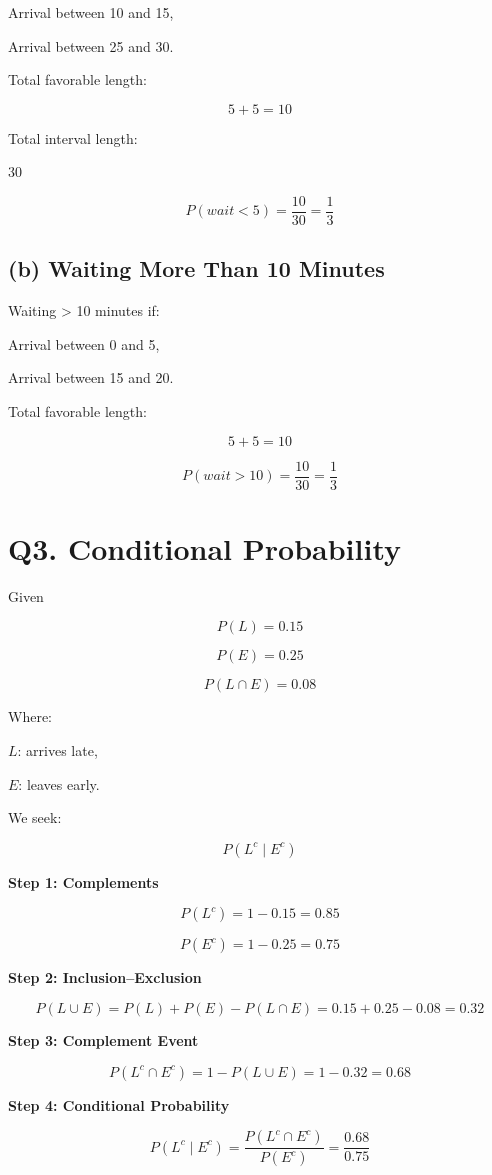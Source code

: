 \documentclass[11pt]{article}
\begin{document}
Arrival between 10 and 15,

Arrival between 25 and 30.

Total favorable length:

\[
5+5=10
\]

Total interval length:

30

\[
P(wait<5)=\frac{10}{30}=\frac{1}{3}
\]

\subsection*{\textbf{(b) Waiting More Than 10 Minutes}}

Waiting > 10 minutes if:

Arrival between 0 and 5,

Arrival between 15 and 20.

Total favorable length:

\[
5+5=10
\]

\[
P(wait>10)=\frac{10}{30}=\frac{1}{3}
\]

\section*{\textbf{Q3. Conditional Probability}}

Given

\[
P(L)=0.15
\]

\[
P(E)=0.25
\]

\[
P(L \cap E)=0.08
\]

Where:

$L$: arrives late,

$E$: leaves early.

We seek:

\[
P(L^c \mid E^c)
\]

\textbf{Step 1: Complements}

\[
P(L^c)=1-0.15=0.85
\]

\[
P(E^c)=1-0.25=0.75
\]

\textbf{Step 2: Inclusion–Exclusion}

\[
P(L \cup E)=P(L)+P(E)-P(L \cap E)=0.15+0.25-0.08=0.32
\]

\textbf{Step 3: Complement Event}

\[
P(L^c \cap E^c)=1-P(L \cup E)=1-0.32=0.68
\]

\textbf{Step 4: Conditional Probability}

\[
P(L^c \mid E^c)=\frac{P(L^c \cap E^c)}{P(E^c)}=\frac{0.68}{0.75}
\]
\end{document}
